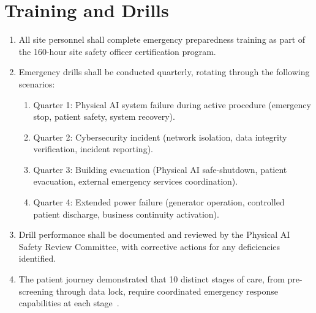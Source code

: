 \documentclass[11pt,letterpaper]{article}
\begin{document}
\section{Training and Drills}

\begin{enumerate}[label=(\alph*)]
\item All site personnel shall complete emergency preparedness training as part
  of the 160-hour site safety officer certification program.

\item Emergency drills shall be conducted quarterly, rotating through the
  following scenarios:
  \begin{enumerate}[label=(\arabic*)]
  \item Quarter 1: Physical AI system failure during active procedure
    (emergency stop, patient safety, system recovery).
  \item Quarter 2: Cybersecurity incident (network isolation, data integrity
    verification, incident reporting).
  \item Quarter 3: Building evacuation (Physical AI safe-shutdown, patient
    evacuation, external emergency services coordination).
  \item Quarter 4: Extended power failure (generator operation, controlled
    patient discharge, business continuity activation).
  \end{enumerate}

\item Drill performance shall be documented and reviewed by the Physical AI
  Safety Review Committee, with corrective actions for any deficiencies
  identified.

\item The patient journey demonstrated that 10 distinct stages of care, from
  pre-screening through data lock, require coordinated emergency response
  capabilities at each stage~\cite{patientjourney2026}.
\end{enumerate}

\printbibliography[title={References}]
\end{document}
